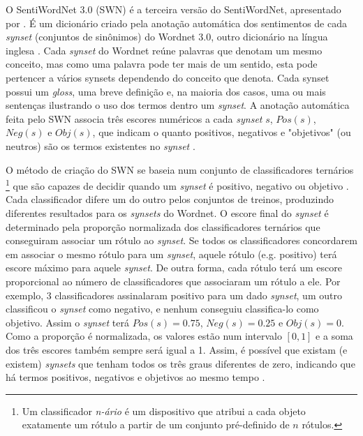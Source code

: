 \documentclass[template.tex]{subfiles}
\begin{document}
O SentiWordNet 3.0 (SWN) é a terceira versão do SentiWordNet, apresentado por . É um dicionário criado pela anotação automática dos sentimentos de cada \textit{synset} (conjuntos de sinônimos) do Wordnet 3.0, outro dicionário na língua inglesa \cite{fellbaum2005wordnet}. Cada \textit{synset} do Wordnet reúne palavras que denotam um mesmo conceito, mas como uma palavra pode ter mais de um sentido, esta pode pertencer a vários synsets dependendo do conceito que denota. Cada synset possui um \textit{gloss}, uma breve definição e, na maioria dos casos, uma ou mais sentenças ilustrando o uso dos termos dentro um \textit{synset}. A anotação automática feita pelo SWN associa três escores numéricos a cada \textit{synset} $s$, $Pos(s)$, $Neg(s)$ e $Obj(s)$, que indicam o quanto positivos, negativos e "objetivos" (ou neutros) são os termos existentes no \textit{synset} \cite{baccianella2010sentiwordnet}. 

 

O método de criação do SWN se baseia num conjunto de classificadores ternários \footnote{Um classificador \textit{n-ário} é um dispositivo que atribui a cada objeto exatamente um rótulo a partir de um conjunto pré-definido de $n$ rótulos.} que são capazes de decidir quando um \textit{synset} é positivo, negativo ou objetivo \cite{esuli2006sentiwordnet}. Cada classificador difere um do outro pelos conjuntos de treinos, produzindo diferentes resultados para os \textit{synsets} do Wordnet. O escore final do \textit{synset} é determinado pela proporção normalizada dos classificadores ternários que conseguiram associar um rótulo ao \textit{synset}. Se todos os classificadores concordarem em associar o mesmo rótulo para um \textit{synset}, aquele rótulo (e.g. positivo) terá escore máximo para aquele \textit{synset}. De outra forma, cada rótulo terá um escore proporcional ao número de classificadores que associaram um rótulo a ele. Por exemplo, 3 classificadores assinalaram positivo para um dado \textit{synset}, um outro classificou o \textit{synset} como negativo, e nenhum conseguiu classifica-lo como objetivo. Assim o \textit{synset} terá $Pos(s) = 0.75$, $Neg(s) = 0.25$ e $Obj(s) = 0$. Como a proporção é normalizada, os valores estão num intervalo $[0,1]$ e a soma dos três escores também sempre será igual a 1. Assim, é possível que existam (e existem) \textit{synsets} que tenham todos os três graus diferentes de zero, indicando que há termos positivos, negativos e objetivos ao mesmo tempo \cite{esuli2006sentiwordnet}. 
\end{document}
